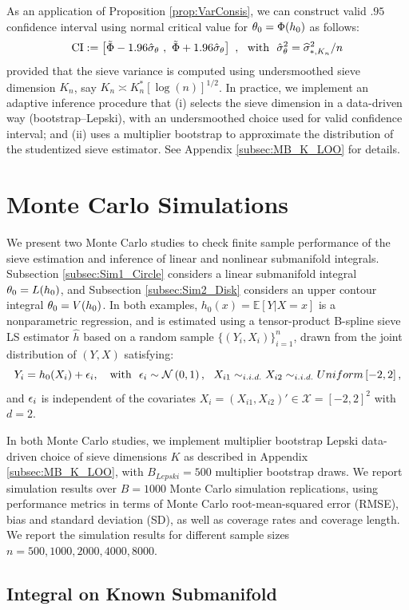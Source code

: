 \documentclass[12pt,american]{article}
\theoremstyle{definition}
\theoremstyle{plain}
\theoremstyle{definition}
\theoremstyle{plain}
\theoremstyle{plain}
\theoremstyle{plain}
\theoremstyle{plain}
\theoremstyle{plain}
\newcommand{\E}{\mathbb{E}}
\begin{document}
As an application of Proposition \ref{prop:VarConsis}, we can construct valid $.95$ confidence
interval using normal critical value for $\theta_0=\Phi(h_0)$ as follows:
\[
\text{CI}:=\left[\tilde{\Phi}-1.96\hat{\sigma}_{\theta}~,~\tilde{\Phi}+1.96\hat{\sigma}_{\theta}\right]~,~~\text{with}~~\hat{\sigma}_{\theta}^{2}=\widehat{\sigma}^2_{*,K_{n}}/n
\]
provided that the sieve variance is computed using undersmoothed sieve dimension $K_n$, say $K_{n}\asymp K^*_n [\log(n)]^{1/2}$. In practice, we implement an adaptive inference procedure that (i) selects the sieve dimension in a data-driven way (bootstrap--Lepski), with an undersmoothed choice used for valid confidence interval; and (ii) uses a multiplier bootstrap to approximate the distribution of the studentized sieve estimator. See Appendix \ref{subsec:MB_K_LOO} for details.

\section{\label{sec:Simulation} Monte Carlo Simulations}

We present two Monte Carlo studies to check finite sample performance of the sieve estimation and inference of linear and nonlinear submanifold integrals. Subsection \ref{subsec:Sim1_Circle} considers a linear submanifold integral $\theta_0=L(h_0)$, and Subsection \ref{subsec:Sim2_Disk} considers an upper contour integral $\theta_0=V(h_0)$. In both examples, $h_0 (x)=\E[Y|X=x]$ is a nonparametric regression, and is estimated using a tensor-product B-spline sieve LS estimator $\hat{h}$ based on a random sample $\{(Y_i,X_i)\}_{i=1}^n$, drawn from the joint distribution of $(Y,X)$ satisfying:
\[
Y_i=h_0(X_i) + \epsilon_{i},~~~\text{with}~~\epsilon_{i}\sim\mathcal{N}\left(0,1\right),~~X_{i1}\sim_{i.i.d.}X_{i2}\sim_{i.i.d.}Uniform\left[-2,2\right],
\]
and $\epsilon_{i}$ is independent of the covariates $X_i=(X_{i1},X_{i2})'\in \mathcal{X}=[-2,2]^2$ with $d=2$. 

In both Monte Carlo studies, we implement multiplier bootstrap Lepski data-driven choice of sieve dimensions $K$ as described in Appendix \ref{subsec:MB_K_LOO}, with $B_{Lepski}=500$ multiplier bootstrap draws. We report simulation results over $B=1000$ Monte Carlo simulation replications, using performance metrics in terms of Monte Carlo root-mean-squared error (RMSE), bias and standard deviation (SD), as well as coverage rates and coverage length. We report the simulation results for different sample sizes $n=500, 1000, 2000, 4000, 8000$.

\subsection{\label{subsec:Sim1_Circle}Integral on Known Submanifold}
\end{document}
